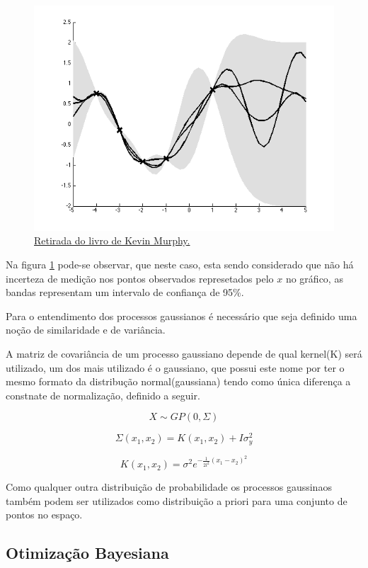 \documentclass[
	12pt,				%
	a4paper,		%
	oneside,    %
	chapter=TITLE,		   %
	section=TITLE,		   %
	subsection=TITLE,	   %
	subsubsection=TITLE, %
	english,			%
	french,				%
	spanish,			%
	brazil,				%
]{abntex2}
\begin{document}
\begin{figure}
\centering
\includegraphics[width=\textwidth,height=0.3\textheight]{fig/gp.png}
\caption{\href{https://github.com/probml/pmtk3/blob/30d7a1952f3979b16e92dbfa4cd1ce0e402cf7d8/docs/demoOutput/bookDemos/(15)-Gaussian_processes/gprDemoNoiseFree_02.png}{Retirada
do livro de Kevin Murphy.\label{gp}}}
\end{figure}

Na figura \ref{gp} pode-se observar, que neste caso, esta sendo
considerado que não há incerteza de medição nos pontos observados
represetados pelo \(x\) no gráfico, as bandas representam um intervalo
de confiança de 95\%.

Para o entendimento dos processos gaussianos é necessário que seja
definido uma noção de similaridade e de variância.

A matriz de covariância de um processo gaussiano depende de qual
kernel(K) será utilizado, um dos mais utilizado é o gaussiano, que
possui este nome por ter o mesmo formato da distribução
normal(gaussiana) tendo como única diferença a constnate de
normalização, definido a seguir.

\[
X \sim GP(0,\Sigma)
\]

\[
\Sigma(x_1,x_2) = K(x_1,x_2) + I\sigma^2_y
\]

\[
K(x_1,x_2) = \sigma^2 e^{-\frac{1}{2l^2}(x_1-x_2)^2}
\]

Como qualquer outra distribuição de probabilidade os processos
gaussinaos também podem ser utilizados como distribuição a priori para
uma conjunto de pontos no espaço.

\hypertarget{otimizauxe7uxe3o-bayesiana}{%
\subsection{Otimização Bayesiana}\label{otimizauxe7uxe3o-bayesiana}}
\end{document}
